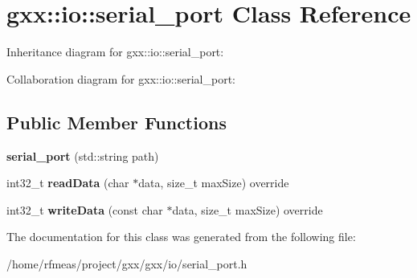 \hypertarget{classgxx_1_1io_1_1serial__port}{}\section{gxx\+:\+:io\+:\+:serial\+\_\+port Class Reference}
\label{classgxx_1_1io_1_1serial__port}


Inheritance diagram for gxx\+:\+:io\+:\+:serial\+\_\+port\+:


Collaboration diagram for gxx\+:\+:io\+:\+:serial\+\_\+port\+:
\subsection*{Public Member Functions}
\begin{DoxyCompactItemize}
\item 
{\bfseries serial\+\_\+port} (std\+::string path)\hypertarget{classgxx_1_1io_1_1serial__port_acdb3140e1d74eb6faf3c0aece351a550}{}\label{classgxx_1_1io_1_1serial__port_acdb3140e1d74eb6faf3c0aece351a550}

\item 
int32\+\_\+t {\bfseries read\+Data} (char $\ast$data, size\+\_\+t max\+Size) override\hypertarget{classgxx_1_1io_1_1serial__port_a37aa778b1a4adc5b0e3cfe42782627c1}{}\label{classgxx_1_1io_1_1serial__port_a37aa778b1a4adc5b0e3cfe42782627c1}

\item 
int32\+\_\+t {\bfseries write\+Data} (const char $\ast$data, size\+\_\+t max\+Size) override\hypertarget{classgxx_1_1io_1_1serial__port_a95670bbfe7d97111dd236124fa6ad2c5}{}\label{classgxx_1_1io_1_1serial__port_a95670bbfe7d97111dd236124fa6ad2c5}

\end{DoxyCompactItemize}


The documentation for this class was generated from the following file\+:\begin{DoxyCompactItemize}
\item 
/home/rfmeas/project/gxx/gxx/io/serial\+\_\+port.\+h\end{DoxyCompactItemize}

